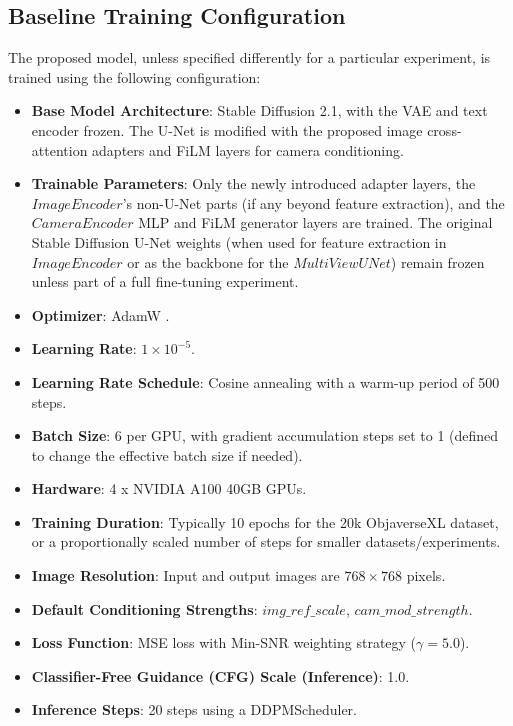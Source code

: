 \subsection{Baseline Training Configuration}\label{ssec:exp_baseline_config}
The proposed model, unless specified differently for a particular experiment, is trained using the following configuration:
\begin{itemize}
  \item \textbf{Base Model Architecture}: Stable Diffusion 2.1, with the VAE and text encoder frozen. The U-Net is modified with the proposed image cross-attention adapters and FiLM layers for camera conditioning.
  \item \textbf{Trainable Parameters}: Only the newly introduced adapter layers, the $ImageEncoder$'s non-U-Net parts (if any beyond feature extraction), and the $CameraEncoder$ MLP and FiLM generator layers are trained. The original Stable Diffusion U-Net weights (when used for feature extraction in $ImageEncoder$ or as the backbone for the $MultiViewUNet$) remain frozen unless part of a full fine-tuning experiment.
  \item \textbf{Optimizer}: AdamW \cite{adamw}.
  \item \textbf{Learning Rate}: $1 \times 10^{-5}$.
  \item \textbf{Learning Rate Schedule}: Cosine annealing with a warm-up period of 500 steps.
  \item \textbf{Batch Size}: 6 per GPU, with gradient accumulation steps set to 1 (defined to change the effective batch size if needed).
  \item \textbf{Hardware}: 4 x NVIDIA A100 40GB GPUs.
  \item \textbf{Training Duration}: Typically 10 epochs for the 20k ObjaverseXL dataset, or a proportionally scaled number of steps for smaller datasets/experiments.
  \item \textbf{Image Resolution}: Input and output images are $768 \times 768$ pixels.
  \item \textbf{Default Conditioning Strengths}: $img\_ref\_scale$, $cam\_mod\_strength$.
  \item \textbf{Loss Function}: MSE loss with Min-SNR weighting strategy ($\gamma=5.0$).
  \item \textbf{Classifier-Free Guidance (CFG) Scale (Inference)}: 1.0.
  \item \textbf{Inference Steps}: 20 steps using a DDPMScheduler.
\end{itemize}

